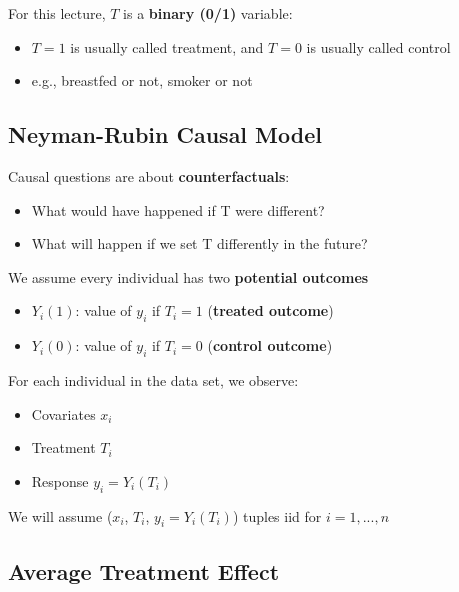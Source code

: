 \documentclass[
  letterpaper,
  DIV=11,
  numbers=noendperiod]{scrreprt}
\providecommand{\tightlist}{%
  \setlength{\itemsep}{0pt}\setlength{\parskip}{0pt}}\usepackage{longtable,booktabs,array}
\begin{document}
For this lecture, \(T\) is a \textbf{binary (0/1)} variable:

\begin{itemize}
\tightlist
\item
  \(T=1\) is usually called treatment, and \(T=0\) is usually called
  control
\item
  e.g., breastfed or not, smoker or not
\end{itemize}

\hypertarget{neyman-rubin-causal-model}{%
\subsection{Neyman-Rubin Causal Model}\label{neyman-rubin-causal-model}}

Causal questions are about \textbf{counterfactuals}:

\begin{itemize}
\tightlist
\item
  What would have happened if T were different?
\item
  What will happen if we set T differently in the future?
\end{itemize}

We assume every individual has two \textbf{potential outcomes}

\begin{itemize}
\tightlist
\item
  \(Y_{i}(1)\): value of \(y_{i}\) if \(T_{i} = 1\) (\textbf{treated
  outcome})
\item
  \(Y_{i}(0)\): value of \(y_{i}\) if \(T_{i} = 0\) (\textbf{control
  outcome})
\end{itemize}

For each individual in the data set, we observe:

\begin{itemize}
\tightlist
\item
  Covariates \(x_{i}\)
\item
  Treatment \(T_{i}\)
\item
  Response \(y_{i} = Y_{i}(T_{i})\)
\end{itemize}

We will assume (\(x_{i}\), \(T_{i}\), \(y_{i} = Y_{i}(T_{i})\)) tuples
iid for \(i = 1,..., n\)

\hypertarget{average-treatment-effect}{%
\subsection{Average Treatment Effect}\label{average-treatment-effect}}
\end{document}

